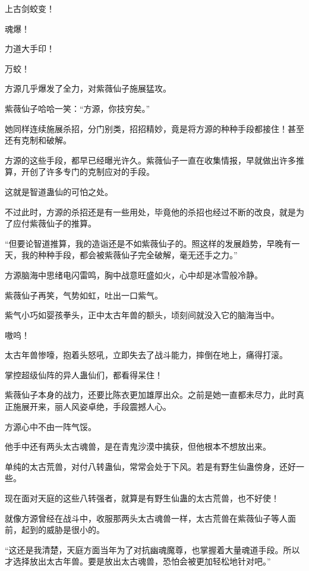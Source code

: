
\begin{this_body}

上古剑蛟变！

魂爆！

力道大手印！

万蛟！

方源几乎爆发了全力，对紫薇仙子施展猛攻。

紫薇仙子哈哈一笑：“方源，你技穷矣。”

她同样连续施展杀招，分门别类，招招精妙，竟是将方源的种种手段都接住！甚至还有克制和破解。

方源的这些手段，都早已经曝光许久。紫薇仙子一直在收集情报，早就做出许多推算，开创了许多专门的克制应对的手段。

这就是智道蛊仙的可怕之处。

不过此时，方源的杀招还是有一些用处，毕竟他的杀招也经过不断的改良，就是为了应付紫薇仙子的推算。

“但要论智道推算，我的造诣还是不如紫薇仙子的。照这样的发展趋势，早晚有一天，我的种种手段，都会被紫薇仙子完全破解，毫无还手之力。”

方源脑海中思绪电闪雷鸣，胸中战意旺盛如火，心中却是冰雪般冷静。

紫薇仙子再笑，气势如虹，吐出一口紫气。

紫气小巧如婴孩拳头，正中太古年兽的额头，顷刻间就没入它的脑海当中。

嗷呜！

太古年兽惨嚎，抱着头怒吼，立即失去了战斗能力，摔倒在地上，痛得打滚。

掌控超级仙阵的异人蛊仙们，都看得呆住！

紫薇仙子本身的战力，还要比陈衣更加雄厚出众。之前是她一直都未尽力，此时真正施展开来，丽人风姿卓绝，手段震撼人心。

方源心中不由一阵气馁。

他手中还有两头太古魂兽，是在青鬼沙漠中擒获，但他根本不想放出来。

单纯的太古荒兽，对付八转蛊仙，常常会处于下风。若是有野生仙蛊傍身，还好一些。

现在面对天庭的这些八转强者，就算是有野生仙蛊的太古荒兽，也不好使！

就像方源曾经在战斗中，收服那两头太古魂兽一样，太古荒兽在紫薇仙子等人面前，起到的威胁是很小的。

“这还是我清楚，天庭方面当年为了对抗幽魂魔尊，也掌握着大量魂道手段。所以才选择放出太古年兽。要是放出太古魂兽，恐怕会被更加轻松地针对吧。”


\end{this_body}
